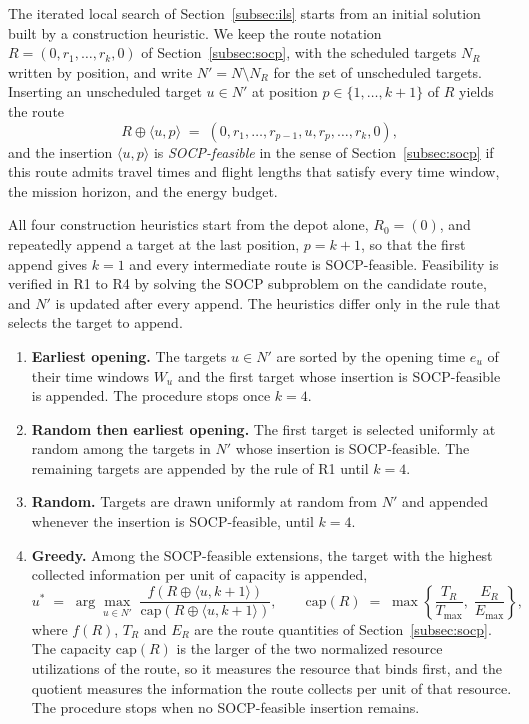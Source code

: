 The iterated local search of Section~\ref{subsec:ils} starts from an initial solution built by a construction heuristic. We keep the route notation $R = (0, r_1, \ldots, r_k, 0)$ of Section~\ref{subsec:socp}, with the scheduled targets $N_R$ written by position, and write $N' = N \setminus N_R$ for the set of unscheduled targets. Inserting an unscheduled target $u \in N'$ at position $p \in \{1, \ldots, k+1\}$ of $R$ yields the route
\[
R \oplus \langle u, p \rangle \;=\; (0, r_1, \ldots, r_{p-1}, u, r_p, \ldots, r_k, 0),
\]
and the insertion $\langle u, p \rangle$ is \emph{SOCP-feasible} in the sense of Section~\ref{subsec:socp} if this route admits travel times and flight lengths that satisfy every time window, the mission horizon, and the energy budget.

All four construction heuristics start from the depot alone, $R_0 = (0)$, and repeatedly append a target at the last position, $p = k+1$, so that the first append gives $k = 1$ and every intermediate route is SOCP-feasible. Feasibility is verified in R1 to R4 by solving the SOCP subproblem on the candidate route, and $N'$ is updated after every append. The heuristics differ only in the rule that selects the target to append.

\begin{enumerate}[label=\textbf{R\arabic*}., leftmargin=2em]
\item \textbf{Earliest opening.}
The targets $u \in N'$ are sorted by the opening time $e_u$ of their time windows $W_u$ and the first target whose insertion is SOCP-feasible is appended. The procedure stops once $k = 4$.

\item \textbf{Random then earliest opening.}
The first target is selected uniformly at random among the targets in $N'$ whose insertion is SOCP-feasible. The remaining targets are appended by the rule of R1 until $k = 4$.

\item \textbf{Random.}
Targets are drawn uniformly at random from $N'$ and appended whenever the insertion is SOCP-feasible, until $k = 4$.

\item \textbf{Greedy.}
Among the SOCP-feasible extensions, the target with the highest collected information per unit of capacity is appended,
\begin{equation}\label{eq:r4-ratio}
u^{*} \;=\; \arg\max_{u \in N'} \; \frac{f(R \oplus \langle u, k+1 \rangle)}{\mathrm{cap}(R \oplus \langle u, k+1 \rangle)},
\qquad
\mathrm{cap}(R) \;=\; \max\!\left\{ \frac{T_R}{T_{\max}},\; \frac{E_R}{E_{\max}} \right\},
\end{equation}
where $f(R)$, $T_R$ and $E_R$ are the route quantities of Section~\ref{subsec:socp}. The capacity $\mathrm{cap}(R)$ is the larger of the two normalized resource utilizations of the route, so it measures the resource that binds first, and the quotient measures the information the route collects per unit of that resource. The procedure stops when no SOCP-feasible insertion remains.
\end{enumerate}

